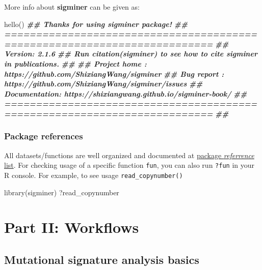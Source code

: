 \documentclass[
  12pt,
  a4paper,
  twoside]{book}
\newenvironment{Shaded}{\begin{snugshade}}{\end{snugshade}}
\newcommand{\DocumentationTok}[1]{\textcolor[rgb]{0.56,0.35,0.01}{\textbf{\textit{#1}}}}
\newcommand{\FunctionTok}[1]{\textcolor[rgb]{0.00,0.00,0.00}{#1}}
\newcommand{\NormalTok}[1]{#1}
\begin{document}
More info about \textbf{sigminer} can be given as:

\begin{Shaded}
\begin{Highlighting}[]
\FunctionTok{hello}\NormalTok{()}
\DocumentationTok{\#\# Thanks for using \textquotesingle{}sigminer\textquotesingle{} package!}
\DocumentationTok{\#\# =========================================================================}
\DocumentationTok{\#\# Version: 2.1.6}
\DocumentationTok{\#\# Run citation(\textquotesingle{}sigminer\textquotesingle{}) to see how to cite sigminer in publications.}
\DocumentationTok{\#\# }
\DocumentationTok{\#\# Project home : https://github.com/ShixiangWang/sigminer}
\DocumentationTok{\#\# Bug report   : https://github.com/ShixiangWang/sigminer/issues}
\DocumentationTok{\#\# Documentation: https://shixiangwang.github.io/sigminer{-}book/}
\DocumentationTok{\#\# =========================================================================}
\DocumentationTok{\#\# }
\end{Highlighting}
\end{Shaded}

\hypertarget{package-references}{%
\section{Package references}\label{package-references}}

All datasets/functions are well organized and documented at \href{https://shixiangwang.github.io/sigminer/reference/index.html}{package \emph{referrence} list}.
For checking usage of a specific function \texttt{fun}, you can also run \texttt{?fun} in your R console.
For example, to see usage \texttt{read\_copynumber()}

\begin{Shaded}
\begin{Highlighting}[]
\FunctionTok{library}\NormalTok{(sigminer)}
\NormalTok{?read\_copynumber}
\end{Highlighting}
\end{Shaded}

\hypertarget{part-part-ii-workflows}{%
\part*{Part II: Workflows}\label{part-part-ii-workflows}}

\hypertarget{basic-workflow}{%
\chapter{Mutational signature analysis basics}\label{basic-workflow}}
\end{document}
